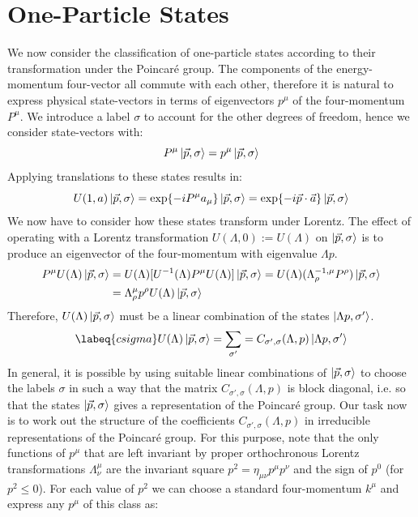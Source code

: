 \documentclass[../main.tex]{subfiles}
\begin{document}
\section{One-Particle States}
We now consider the classification of one-particle states according to their transformation under the Poincaré group. The components of the energy-momentum four-vector all commute with each other, therefore it is natural to express physical state-vectors in terms of eigenvectors $p^\mu$ of the four-momentum $P^\mu$. We introduce a label $\sigma$ to account for the other degrees of freedom, hence we consider state-vectors with:
\[
P^\mu\ket{\vec{p},\sigma}=p^\mu\ket{\vec{p},\sigma}
\]
Applying translations to these states results in:
\[
U(1,a)\ket{\vec{p},\sigma}=\exp{-iP^\mu a_\mu}\ket{\vec{p},\sigma}=\exp{-i\Vec{p}\cdot \vec{a}}\ket{\vec{p},\sigma}
\]
We now have to consider how these states transform under Lorentz. The effect of operating with a Lorentz transformation $U(\Lambda,0):=U(\Lambda)$ on $\ket{\vec{p},\sigma}$ is to produce an eigenvector of the four-momentum with eigenvalue $\Lambda p$.
\begin{align*}
P^\mu U(\Lambda)\ket{\vec{p},\sigma}&=U(\Lambda)[U^{-1}(\Lambda)P^\mu U(\Lambda)]\ket{\vec{p},\sigma}=U(\Lambda)(\Lambda^{-1,\mu}_\rho P^\rho)\ket{\vec{p},\sigma}\\
&=\Lambda^\mu_\rho p^\rho U(\Lambda)\ket{\vec{p},\sigma}
\end{align*}
Therefore, $U(\Lambda)\ket{\vec{p},\sigma}$ must be a linear combination of the states $\ket{\Lambda p,\sigma'}$.
\begin{equation}
\labeq{csigma}
U(\Lambda)\ket{\vec{p},\sigma}=\sum_{\sigma'}=C_{\sigma',\sigma}(\Lambda,p)\ket{\Lambda p,\sigma'}
\end{equation}
In general, it is possible by using suitable linear combinations of $\ket{\vec{p},\sigma}$ to choose the labels $\sigma$ in such a way that the matrix $C_{\sigma',\sigma}(\Lambda,p)$ is block diagonal, i.e. so that the states $\ket{\vec{p},\sigma}$ gives a representation of the Poincaré group. Our task now is to work out the structure of the coefficients $C_{\sigma',\sigma}(\Lambda,p)$ in irreducible representations of the Poincaré group. For this purpose, note that the only functions of $p^\mu$ that are left invariant by proper orthochronous Lorentz transformations $\Lambda^\mu_\nu$ are the invariant square $p^2=\eta_{\mu\nu}p^\mu p^\nu$ and the sign of $p^0$ (for $p^2\le0$). For each value of $p^2$ we can choose a standard four-momentum $k^\mu$ and express any $p^\mu$ of this class as:
\end{document}
